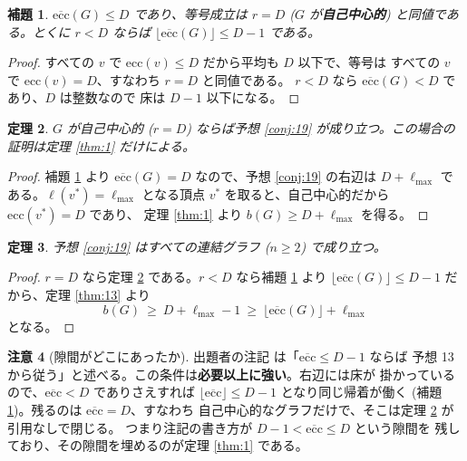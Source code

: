 \documentclass[paper=a4,fontsize=10.5pt,jafontsize=10.5pt]{jlreq}
\theoremstyle{plain}
\newtheorem{theorem}{定理}[section]
\newtheorem{lemma}[theorem]{補題}
\theoremstyle{definition}
\newtheorem{remark}[theorem]{注意}
\begin{document}
\begin{lemma}\label{lem:sc}
$\overline{\mathrm{ecc}}(G) \le D$ であり、等号成立は $r = D$
($G$ が\textbf{自己中心的}) と同値である。とくに $r < D$ ならば
$\lfloor \overline{\mathrm{ecc}}(G) \rfloor \le D - 1$ である。
\end{lemma}

\begin{proof}
すべての $v$ で $\mathrm{ecc}(v) \le D$ だから平均も $D$ 以下で、等号は
すべての $v$ で $\mathrm{ecc}(v) = D$、すなわち $r = D$ と同値である。
$r < D$ なら $\overline{\mathrm{ecc}}(G) < D$ であり、$D$ は整数なので
床は $D - 1$ 以下になる。
\end{proof}

\begin{theorem}\label{thm:sc}
$G$ が自己中心的 ($r = D$) ならば予想 \ref{conj:19} が成り立つ。この場合の
証明は定理 \ref{thm:1} だけによる。
\end{theorem}

\begin{proof}
補題 \ref{lem:sc} より $\overline{\mathrm{ecc}}(G) = D$ なので、予想
\ref{conj:19} の右辺は $D + \ell_{\max}$ である。$\ell(v^*) = \ell_{\max}$
となる頂点 $v^*$ を取ると、自己中心的だから $\mathrm{ecc}(v^*) = D$ であり、
定理 \ref{thm:1} より $b(G) \ge D + \ell_{\max}$ を得る。
\end{proof}

\begin{theorem}\label{thm:19}
予想 \ref{conj:19} はすべての連結グラフ ($n \ge 2$) で成り立つ。
\end{theorem}

\begin{proof}
$r = D$ なら定理 \ref{thm:sc} である。$r < D$ なら補題 \ref{lem:sc} より
$\lfloor \overline{\mathrm{ecc}}(G) \rfloor \le D - 1$ だから、定理
\ref{thm:13} より
\[ b(G) \ \ge \ D + \ell_{\max} - 1
   \ \ge \ \lfloor \overline{\mathrm{ecc}}(G) \rfloor + \ell_{\max} \]
となる。
\end{proof}

\begin{remark}[隙間がどこにあったか]\label{rem:gap}
出題者の注記 \cite{wowii} は「$\overline{\mathrm{ecc}} \le D - 1$ ならば
予想 13 から従う」と述べる。この条件は\textbf{必要以上に強い}。右辺には床が
掛かっているので、$\overline{\mathrm{ecc}} < D$ でありさえすれば
$\lfloor \overline{\mathrm{ecc}} \rfloor \le D - 1$ となり同じ帰着が働く
(補題 \ref{lem:sc})。残るのは $\overline{\mathrm{ecc}} = D$、すなわち
自己中心的なグラフだけで、そこは定理 \ref{thm:sc} が引用なしで閉じる。
つまり注記の書き方が $D - 1 < \overline{\mathrm{ecc}} \le D$ という隙間を
残しており、その隙間を埋めるのが定理 \ref{thm:1} である。
\end{remark}
\end{document}
